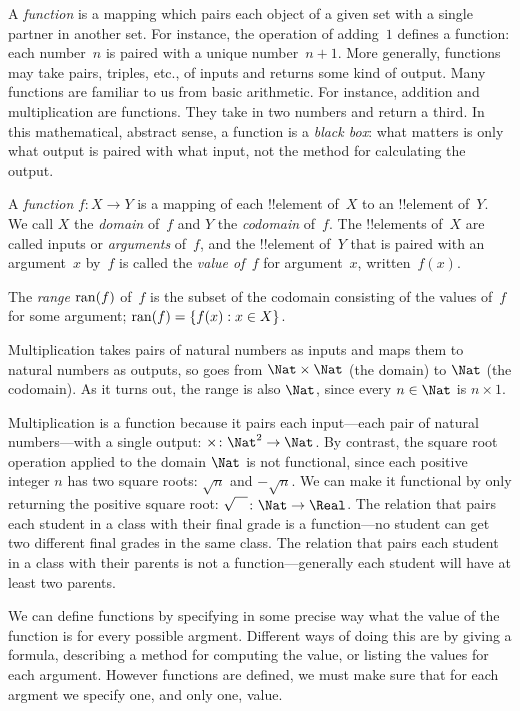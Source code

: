 \documentclass[../../../include/open-logic-section]{subfiles}
\begin{document}

\begin{explain}
A \emph{function} is a mapping which pairs each object of a given
set with a single partner in another set. For instance, the operation
of adding~$1$ defines a function: each number~$n$ is paired with a
unique number~$n+1$. More generally, functions may take pairs,
triples, etc., of inputs and returns some kind of output. Many
functions are familiar to us from basic arithmetic. For instance,
addition and multiplication are functions. They take in two numbers
and return a third.  In this mathematical, abstract sense, a function
is a \emph{black box}: what matters is only what output is paired with
what input, not the method for calculating the output.
\end{explain}

\begin{defn}[Function]
A \emph{function} $f \colon X \to Y$ is a mapping of each !!{element}
of~$X$ to an !!{element} of~$Y$. We call $X$ the \emph{domain} of~$f$
and $Y$ the \emph{codomain} of~$f$.  The !!{element}s of~$X$ are
called inputs or \emph{arguments} of~$f$, and the !!{element} of~$Y$
that is paired with an argument~$x$ by~$f$ is called the \emph{value
  of~$f$} for argument~$x$, written~$f(x)$.

The \emph{range} $\mathrm{ran}(f)$ of~$f$ is the subset of the codomain
consisting of the values of~$f$ for some argument; $\mathrm{ran}(f) =
\{ f(x) : x \in X \}$.
\end{defn}

\begin{ex}
Multiplication takes pairs of natural numbers as inputs and maps them
to natural numbers as outputs, so goes from $\Nat \times \Nat$ (the
domain) to $\Nat$ (the codomain). As it turns out, the range is also
$\Nat$, since every $n \in \Nat$ is $n \times 1$.
\end{ex}

\begin{explain}
Multiplication is a function because it pairs each input---each pair
of natural numbers---with a single output: $\times \colon \Nat^2 \to
\Nat$. By contrast, the square root operation applied to the domain
$\Nat$ is not functional, since each positive integer $n$ has two
square roots: $\sqrt{n}$ and $-\sqrt{n}$. We can make it functional by
only returning the positive square root: $\sqrt{\phantom{X}} \colon
\Nat \to \Real$. The relation that pairs each student in a class with
their final grade is a function---no student can get two different
final grades in the same class. The relation that pairs each student
in a class with their parents is not a function---generally each
student will have at least two parents.

We can define functions by specifying in some precise way what the
value of the function is for every possible argment. Different ways of
doing this are by giving a formula, describing a method for computing
the value, or listing the values for each argument. However functions
are defined, we must make sure that for each argment we specify one,
and only one, value.
\end{explain}
\end{document}
